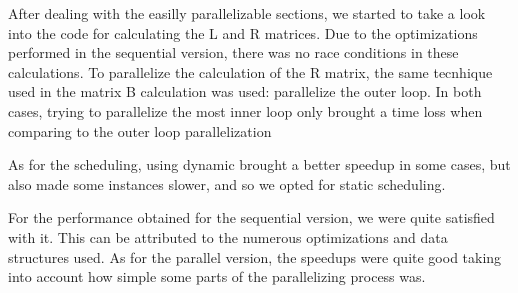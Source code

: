 \documentclass[a4paper]{article}
\begin{document}
After dealing with the easilly parallelizable sections, we started to take a look
into the code for calculating the L and R matrices. Due to the optimizations performed in
the sequential version, there was no race conditions in these calculations. %
To parallelize the calculation of the R matrix, the same tecnhique used in the matrix B 
calculation was used: parallelize the outer loop. In both cases, trying to parallelize
the most inner loop only brought a time loss when comparing to the outer loop parallelization


As for the scheduling, using dynamic brought a better speedup in some cases, but also made
some instances slower, and so we opted for static scheduling.


For the performance obtained for the sequential version, we were quite satisfied with
it. This can be attributed to the numerous optimizations and data structures used.
As for the parallel version, the speedups were quite good taking into account how
simple some parts of the parallelizing process was. %

\end{document}
